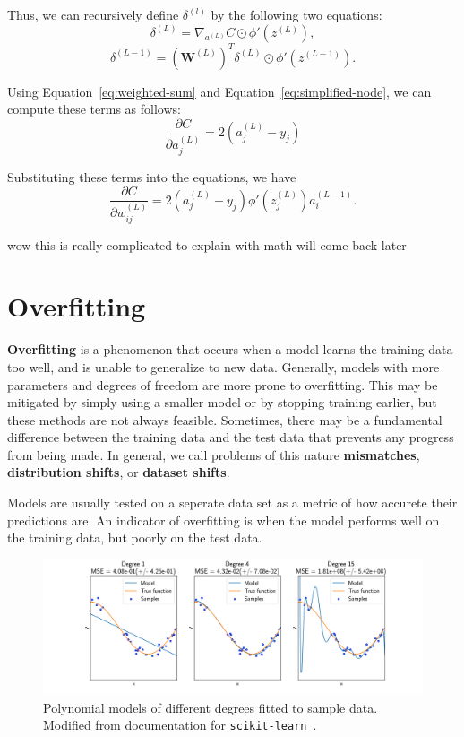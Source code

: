 \documentclass[12pt]{report}
\theoremstyle{definition}
\theoremstyle{remark}
\begin{document}
Thus, we can recursively define $\delta^{(l)}$ by the following two equations:
\begin{equation}
    \delta^{(L)} = \nabla_{a^{(L)}}C \odot \phi'(z^{(L)}),
\end{equation}
\begin{equation}
    \delta^{(L-1)} = {\left(\mathbf{W}^{(L)}\right)}^T \delta^{(L)} \odot \phi'(z^{(L-1)}).
\end{equation}

Using Equation~\ref{eq:weighted-sum} and Equation~\ref{eq:simplified-node}, we can compute these terms as follows:
\begin{equation}
    \frac{\partial C}{\partial a_j^{(L)}} = 2(a_j^{(L)} - y_j)
\end{equation}

Substituting these terms into the equations, we have
\begin{equation}
    \frac{\partial C}{\partial w_{ij}^{(L)}} = 2(a_j^{(L)} - y_j) \phi'(z_j^{(L)}) a_i^{(L-1)}.
\end{equation}

wow this is really complicated to explain with math will come back later

\section{Overfitting}\label{sec:overfitting}
\textbf{Overfitting} is a phenomenon that occurs when a model learns the training data too well, and is unable to generalize to new data. Generally, models with more parameters and degrees of freedom are more prone to overfitting. This may be mitigated by simply using a smaller model or by stopping training earlier, but these methods are not always feasible. Sometimes, there may be a fundamental difference between the training data and the test data that prevents any progress from being made. In general, we call problems of this nature \textbf{mismatches}, \textbf{distribution shifts}, or \textbf{dataset shifts}.

Models are usually tested on a seperate data set as a metric of how accurete their predictions are. An indicator of overfitting is when the model performs well on the training data, but poorly on the test data.

\begin{figure}
    \centering
    \includegraphics[width=\linewidth]{figs/underfitting_overfitting.png}
    \caption{Polynomial models of different degrees fitted to sample data. Modified from documentation for \texttt{scikit-learn}~\cite{pedregosa_scikit-learn_2011}.}
    \label{fig:overfitting}
\end{figure}
\end{document}
